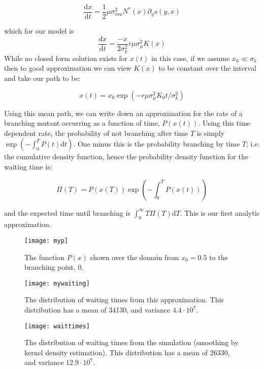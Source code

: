 \documentclass[letterpaper,10pt]{article}
\newcommand{\ud}{\mathrm{d}}
\begin{document}
\begin{equation}
\frac{\ud x}{\ud t} = \frac{1}{2} \mu \sigma_{mu}^2 N^*(x) \partial_y s(y,x)
\end{equation}

which for our model is  
\begin{equation}
\frac{\ud x}{\ud t} = \frac{-x}{2\sigma_k^2} r \mu \sigma_{\mu}^2 K(x) 
\end{equation}
While no closed form solution exists for $x(t)$ in this case, if we assume $x_0 \ll \sigma_k$ then to good approximation we can view $K(x)$ to be constant over the interval and take our path to be:

\begin{equation}
x(t) = x_0 \exp\left( -r \mu \sigma_{\mu}^2 K_0 t/\sigma_k^2\right)
\end{equation}

Using this mean path, we can write down an approximation for the rate of a branching mutant occurring as a function of time, $P(x(t))$.  Using this time dependent rate, the probability of not branching after time $T$ is simply $\exp\left( - \int_0^T P(t)\ud t \right)$.  One minus this is the probability branching by time $T$; i.e. the cumulative density function, hence the probability density function for the waiting time is:

\begin{equation}
\Pi(T) = P(x(T)) \exp\left( -\int_0^T P(x(t)) \right)
\label{pdf}
\end{equation}

and the expected time until branching is $\int_0^{\infty} T \Pi(T) \ud T$. This is our first analytic approximation.  

\begin{figure}
\begin{center}
\texttt{[image: myp]}
\caption{The function $P(x)$ shown over the domain from $x_0 = 0.5 $ to the branching point, 0.}
\end{center}
\end{figure}

\begin{figure}
\begin{center}
\texttt{[image: mywaiting]}
\caption{The distribution of waiting times from this approximation.  This distribution has a mean of 34130, and variance $4.4\cdot 10^7$.}
\end{center}
\end{figure}

\begin{figure}
\begin{center}
\texttt{[image: waittimes]}
\caption{The distribution of waiting times from the simulation (smoothing by kernel density estimation).   This distribution has a mean of 26330, and variance $12.9\cdot 10^7$.}
\end{center}
\end{figure}
\end{document}
